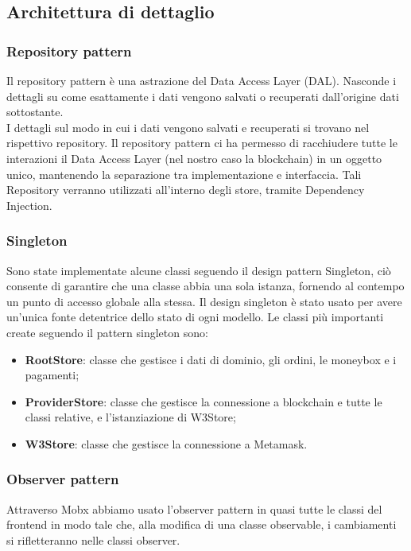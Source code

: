 \clearpage
\subsection{Architettura di dettaglio}

\subsubsection{Repository pattern}

Il repository pattern è una astrazione del Data Access Layer (DAL\glo). Nasconde i dettagli su come esattamente i dati vengono salvati o recuperati dall'origine dati sottostante.\\
I dettagli sul modo in cui i dati vengono salvati e recuperati si trovano nel rispettivo repository.
Il repository pattern ci ha permesso di racchiudere tutte le interazioni il Data Access Layer (nel nostro caso la blockchain) in un oggetto unico, mantenendo la separazione tra implementazione e interfaccia. Tali Repository verranno utilizzati all’interno degli store, tramite Dependency Injection\glo.

\subsubsection{Singleton}

Sono state implementate alcune classi seguendo il design pattern Singleton,
 ciò consente di garantire che una classe abbia una sola istanza, fornendo al contempo un punto di accesso globale alla stessa.
Il design singleton è stato usato per avere un'unica fonte detentrice dello stato di ogni modello.
Le classi più importanti create seguendo il pattern singleton sono:

\begin{itemize}
    \item \textbf{RootStore}: classe che gestisce i dati di dominio, gli ordini, le moneybox e i pagamenti;
    \item \textbf{ProviderStore}: classe che gestisce la connessione a blockchain e tutte le classi relative, e l'istanziazione di W3Store;
    \item \textbf{W3Store}: classe che gestisce la connessione a Metamask.
\end{itemize}

\subsubsection{Observer pattern}

Attraverso Mobx abbiamo usato l'observer pattern in quasi tutte le classi del frontend in modo tale che, alla modifica di una classe observable, i cambiamenti si rifletteranno nelle classi observer.